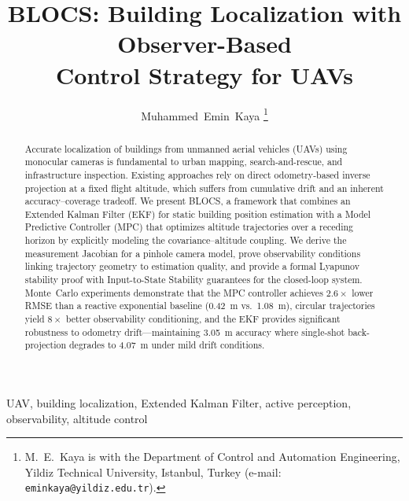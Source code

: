 \documentclass[journal]{IEEEtran}
\begin{document}
\title{BLOCS: Building Localization with Observer-Based\\Control Strategy for UAVs}

\author{Muhammed~Emin~Kaya%
\thanks{M.~E.~Kaya is with the Department of Control and Automation Engineering, Yildiz Technical University, Istanbul, Turkey (e-mail: \texttt{eminkaya@yildiz.edu.tr}).}}


\maketitle

\begin{abstract}
Accurate localization of buildings from unmanned aerial vehicles (UAVs) using monocular cameras is fundamental to urban mapping, search-and-rescue, and infrastructure inspection.
Existing approaches rely on direct odometry-based inverse projection at a fixed flight altitude, which suffers from cumulative drift and an inherent accuracy--coverage tradeoff.
We present \textsc{BLOCS}, a framework that combines an Extended Kalman Filter (EKF) for static building position estimation with a Model Predictive Controller (MPC) that optimizes altitude trajectories over a receding horizon by explicitly modeling the covariance--altitude coupling.
We derive the measurement Jacobian for a pinhole camera model, prove observability conditions linking trajectory geometry to estimation quality, and provide a formal Lyapunov stability proof with Input-to-State Stability guarantees for the closed-loop system.
Monte~Carlo experiments demonstrate that the MPC controller achieves $2.6\times$ lower RMSE than a reactive exponential baseline (\SI{0.42}{m} vs.\ \SI{1.08}{m}), circular trajectories yield $8\times$ better observability conditioning, and the EKF provides significant robustness to odometry drift---maintaining \SI{3.05}{m} accuracy where single-shot back-projection degrades to \SI{4.07}{m} under mild drift conditions.
\end{abstract}

\begin{IEEEkeywords}
UAV, building localization, Extended Kalman Filter, active perception, observability, altitude control
\end{IEEEkeywords}
\end{document}
